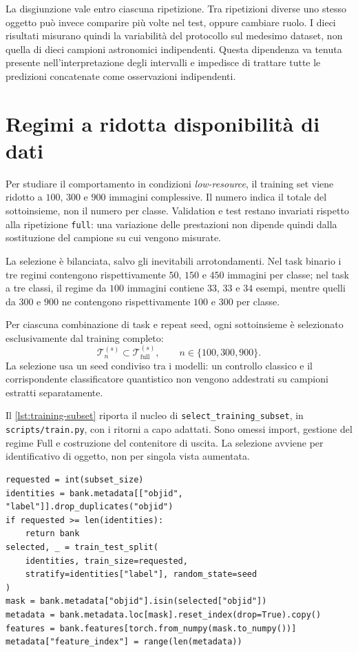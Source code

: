 La disgiunzione vale entro ciascuna ripetizione. Tra ripetizioni diverse
uno stesso oggetto può invece comparire più volte nel test, oppure
cambiare ruolo. I dieci risultati misurano quindi la variabilità del
protocollo sul medesimo dataset, non quella di dieci campioni astronomici
indipendenti. Questa dipendenza va tenuta presente nell'interpretazione
degli intervalli e impedisce di trattare tutte le predizioni concatenate
come osservazioni indipendenti.

\section{Regimi a ridotta disponibilità di dati}
\label{sec:subset}

Per studiare il comportamento in condizioni \emph{low-resource}, il
training set viene ridotto a \(100\), \(300\) e \(900\) immagini
complessive. Il numero indica il totale del sottoinsieme, non il numero
per classe. Validation e test restano invariati rispetto alla
ripetizione \texttt{full}: una variazione delle prestazioni non dipende
quindi dalla sostituzione del campione su cui vengono misurate.

La selezione è bilanciata, salvo gli inevitabili arrotondamenti.
Nel task binario i tre regimi contengono rispettivamente \(50\), \(150\)
e \(450\) immagini per classe; nel task a tre classi, il regime da
\(100\) immagini contiene \(33\), \(33\) e \(34\) esempi, mentre quelli
da \(300\) e \(900\) ne contengono rispettivamente \(100\) e \(300\)
per classe.

Per ciascuna combinazione di task e repeat seed, ogni sottoinsieme
è selezionato esclusivamente dal training completo:
\begin{equation}
  \mathcal{T}_{n}^{(s)}\subset\mathcal{T}_{\mathrm{full}}^{(s)},
  \qquad n\in\{100,300,900\}.
  \label{eq:subset-training}
\end{equation}
La selezione usa un seed condiviso tra i modelli:
un controllo classico e il corrispondente classificatore quantistico
non vengono addestrati su campioni estratti separatamente.

Il \cref{lst:training-subset} riporta il nucleo di
\texttt{select\_training\_subset}, in \texttt{scripts/train.py},
con i ritorni a capo adattati. Sono omessi import, gestione del regime
Full e costruzione del contenitore di uscita. La selezione avviene per
identificativo di oggetto, non per singola vista aumentata.

\begin{code}
\begin{verbatim}
requested = int(subset_size)
identities = bank.metadata[["objid", "label"]].drop_duplicates("objid")
if requested >= len(identities):
    return bank
selected, _ = train_test_split(
    identities, train_size=requested,
    stratify=identities["label"], random_state=seed
)
mask = bank.metadata["objid"].isin(selected["objid"])
metadata = bank.metadata.loc[mask].reset_index(drop=True).copy()
features = bank.features[torch.from_numpy(mask.to_numpy())]
metadata["feature_index"] = range(len(metadata))
\end{verbatim}
\caption{Selezione stratificata dei soli dati di training.}
\label{lst:training-subset}
\end{code}

